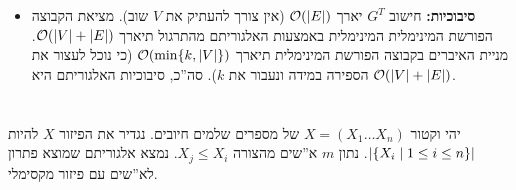 \documentclass[]{../../../../tex/classes/homework}
\begin{document}
\begin{itemize}
\begin{itemize}
\begin{itemize}[*]
			\end{itemize}
		\end{itemize}
		\textbf{שאלה לבודק: }יש דרך יותר טובה לנסח לעיל את הכותרות ''אם האלגו' לא פולט [...]'' ו''אם האלגו פולט פלט הפלט תקין``? (כלומר, האם יש שמות במדמ''ח ל''גרירה דו־כיוונית`` מהסוג הזה). 
		\item \textbf{סיבוכיות: }חישוב $G^{T}$ יארך $\mathcal{O}(\left \lvert E \right \rvert)$ (אין צורך להעתיק את $V$ שוב). מציאת הקבוצה הפורשת המינימלית המינימלית באמצעות האלגוריתם מהתרגול תיארך $\mathcal{O}(\left \lvert V \right \rvert + \left \lvert E \right \rvert)$. מניית האיברים בקבוצה הפורשת המינימלית תיארך $\mathcal{O}(\min\{k, \left \lvert V \right \rvert\})$ (כי נוכל לעצור את הספירה במידה ונעבור את $k$). סה''כ, סיבוכיות האלגוריתם היא $\mathcal{O}(\left \lvert V \right \rvert + \left \lvert E \right \rvert)$. 
	\end{itemize}
	
	\npage
	\section{}
	יהי וקטור $X = (X_1 \dots X_n)$ של מספרים שלמים חיובים. נגדיר את הפיזור $X$ להיות $\left \lvert \{X_i \mid 1 \le i \le n\} \right \rvert$. נתון $m$ א''שים מהצורה $X_j \le X_i$. נמצא אלגוריתם שמוצא פתרון לא''שים עם פיזור מקסימלי. 
	
\end{document}
